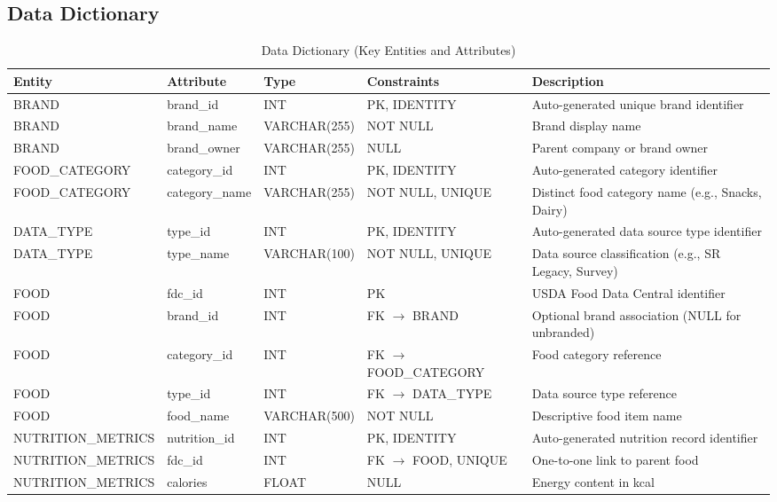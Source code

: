\subsection{Data Dictionary}

\begin{table}[H]
\centering
\caption{Data Dictionary (Key Entities and Attributes)}
\label{tab:data-dict}
\scriptsize
\begin{tabularx}{\textwidth}{|l|l|l|l|X|}
\hline
\rowcolor{gray!20} \textbf{Entity} & \textbf{Attribute} & \textbf{Type} & \textbf{Constraints} & \textbf{Description} \\ \hline
BRAND & brand\_id & INT & PK, IDENTITY & Auto-generated unique brand identifier \\ \hline
BRAND & brand\_name & VARCHAR(255) & NOT NULL & Brand display name \\ \hline
BRAND & brand\_owner & VARCHAR(255) & NULL & Parent company or brand owner \\ \hline
FOOD\_CATEGORY & category\_id & INT & PK, IDENTITY & Auto-generated category identifier \\ \hline
FOOD\_CATEGORY & category\_name & VARCHAR(255) & NOT NULL, UNIQUE & Distinct food category name (e.g., Snacks, Dairy) \\ \hline
DATA\_TYPE & type\_id & INT & PK, IDENTITY & Auto-generated data source type identifier \\ \hline
DATA\_TYPE & type\_name & VARCHAR(100) & NOT NULL, UNIQUE & Data source classification (e.g., SR Legacy, Survey) \\ \hline
FOOD & fdc\_id & INT & PK & USDA Food Data Central identifier \\ \hline
FOOD & brand\_id & INT & FK $\rightarrow$ BRAND & Optional brand association (NULL for unbranded) \\ \hline
FOOD & category\_id & INT & FK $\rightarrow$ FOOD\_CATEGORY & Food category reference \\ \hline
FOOD & type\_id & INT & FK $\rightarrow$ DATA\_TYPE & Data source type reference \\ \hline
FOOD & food\_name & VARCHAR(500) & NOT NULL & Descriptive food item name \\ \hline
NUTRITION\_METRICS & nutrition\_id & INT & PK, IDENTITY & Auto-generated nutrition record identifier \\ \hline
NUTRITION\_METRICS & fdc\_id & INT & FK $\rightarrow$ FOOD, UNIQUE & One-to-one link to parent food \\ \hline
NUTRITION\_METRICS & calories & FLOAT & NULL & Energy content in kcal \\ \hline

\end{tabularx}
\end{table}
